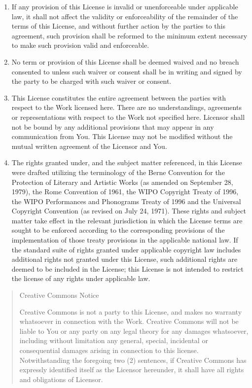\documentclass[letterpaper,10pt,english]{manual}
\begin{document}
\begin{enumerate}
\begin{enumerate}
\item {} 
If any provision of this License is invalid or unenforceable under applicable law, it shall not affect the validity or enforceability of the remainder of the terms of this License, and without further action by the parties to this agreement, such provision shall be reformed to the minimum extent necessary to make such provision valid and enforceable.

\item {} 
No term or provision of this License shall be deemed waived and no breach consented to unless such waiver or consent shall be in writing and signed by the party to be charged with such waiver or consent.

\item {} 
This License constitutes the entire agreement between the parties with respect to the Work licensed here. There are no understandings, agreements or representations with respect to the Work not specified here. Licensor shall not be bound by any additional provisions that may appear in any communication from You. This License may not be modified without the mutual written agreement of the Licensor and You.

\item {} 
The rights granted under, and the subject matter referenced, in this License were drafted utilizing the terminology of the Berne Convention for the Protection of Literary and Artistic Works (as amended on September 28, 1979), the Rome Convention of 1961, the WIPO Copyright Treaty of 1996, the WIPO Performances and Phonograms Treaty of 1996 and the Universal Copyright Convention (as revised on July 24, 1971). These rights and subject matter take effect in the relevant jurisdiction in which the License terms are sought to be enforced according to the corresponding provisions of the implementation of those treaty provisions in the applicable national law. If the standard suite of rights granted under applicable copyright law includes additional rights not granted under this License, such additional rights are deemed to be included in the License; this License is not intended to restrict the license of any rights under applicable law.

\end{enumerate}
\begin{quote}

Creative Commons Notice

Creative Commons is not a party to this License, and makes no warranty whatsoever in connection with the Work. Creative Commons will not be liable to You or any party on any legal theory for any damages whatsoever, including without limitation any general, special, incidental or consequential damages arising in connection to this license. Notwithstanding the foregoing two (2) sentences, if Creative Commons has expressly identified itself as the Licensor hereunder, it shall have all rights and obligations of Licensor.


\end{quote}
\end{enumerate}
\end{document}
